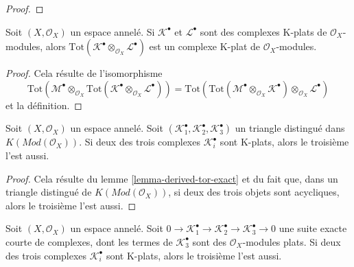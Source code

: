 {\begin{proof}
\end{proof}

\begin{lemma}

\label{lemma-tensor-product-K-flat}

Soit $(X, \mathcal{O}_X)$ un espace annelé. Si $\mathcal{K}^\bullet$ et $\mathcal{L}^\bullet$ sont des complexes K-plats de $\mathcal{O}_X$-modules, alors
$\text{Tot}(\mathcal{K}^\bullet \otimes_{\mathcal{O}_X} \mathcal{L}^\bullet)$
est un complexe K-plat de $\mathcal{O}_X$-modules.

\end{lemma}

\begin{proof}

Cela résulte de l'isomorphisme
$$
\text{Tot}(\mathcal{M}^\bullet \otimes_{\mathcal{O}_X}
\text{Tot}(\mathcal{K}^\bullet \otimes_{\mathcal{O}_X} \mathcal{L}^\bullet))
=
\text{Tot}(\text{Tot}(\mathcal{M}^\bullet \otimes_{\mathcal{O}_X}
\mathcal{K}^\bullet) \otimes_{\mathcal{O}_X} \mathcal{L}^\bullet)
$$
et la définition.

\end{proof}

\begin{lemma}

\label{lemma-K-flat-two-out-of-three}
Soit $(X, \mathcal{O}_X)$ un espace annelé. Soit $(\mathcal{K}_1^\bullet, \mathcal{K}_2^\bullet, \mathcal{K}_3^\bullet)$ un triangle distingué dans $K(\textit{Mod}(\mathcal{O}_X))$. Si deux des trois complexes $\mathcal{K}_i^\bullet$ sont K-plats, alors le troisième l'est aussi.
\end{lemma}

\begin{proof}
Cela résulte du lemme \ref{lemma-derived-tor-exact} et du fait que, dans un triangle distingué de $K(\textit{Mod}(\mathcal{O}_X))$, si deux des trois objets sont acycliques, alors le troisième l'est aussi.
\end{proof}

\begin{lemma}

\label{lemma-K-flat-two-out-of-three-ses}
Soit $(X, \mathcal{O}_X)$ un espace annelé. Soit $0 \to \mathcal{K}_1^\bullet \to \mathcal{K}_2^\bullet \to
\mathcal{K}_3^\bullet \to 0$ une suite exacte courte de complexes, dont les termes de $\mathcal{K}_3^\bullet$ sont des $\mathcal{O}_X$-modules plats. Si deux des trois complexes $\mathcal{K}_i^\bullet$ sont K-plats, alors le troisième l'est aussi.
\end{lemma}

}
